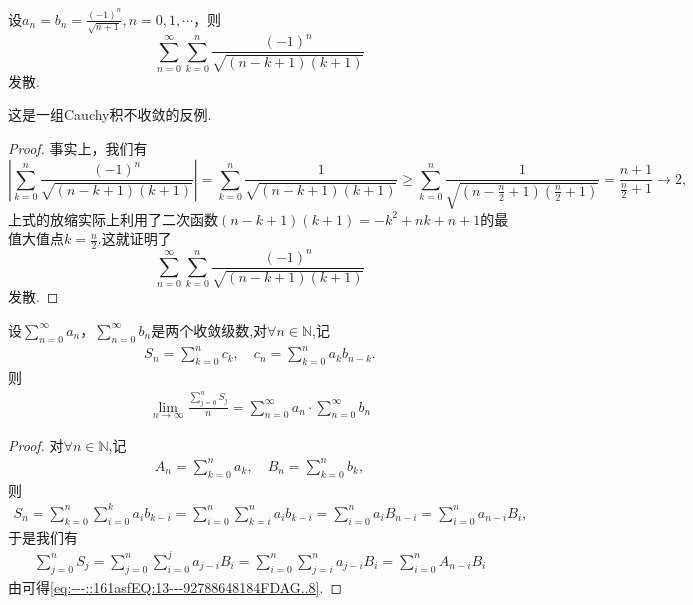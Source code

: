 \documentclass[../../main.tex]{subfiles}%
\begin{document}
\begin{example}
设\(a_n = b_n = \frac{(-1)^n}{\sqrt{n + 1}}, n = 0,1,\cdots\)，则
\[
\sum_{n = 0}^{\infty} \sum_{k = 0}^{n} \frac{(-1)^n}{\sqrt{(n - k + 1)(k + 1)}}
\]
发散.
\end{example}
\begin{remark}
这是一组Cauchy积不收敛的反例.
\end{remark}
\begin{proof}
事实上，我们有
\[
\left| \sum_{k = 0}^{n} \frac{(-1)^n}{\sqrt{(n - k + 1)(k + 1)}} \right| = \sum_{k = 0}^{n} \frac{1}{\sqrt{(n - k + 1)(k + 1)}} \geqslant \sum_{k = 0}^{n} \frac{1}{\sqrt{\left(n - \frac{n}{2} + 1\right)\left(\frac{n}{2} + 1\right)}} = \frac{n + 1}{\frac{n}{2} + 1} \to 2,
\]
上式的放缩实际上利用了二次函数$\left( n-k+1 \right) \left( k+1 \right) =-k^2+nk+n+1$的最值大值点$k=\frac{n}{2}$.这就证明了
\[
\sum_{n = 0}^{\infty} \sum_{k = 0}^{n} \frac{(-1)^n}{\sqrt{(n - k + 1)(k + 1)}}
\]
发散.
\end{proof}

\begin{proposition}\label{proposition:命题3....4}
设\(\sum_{n = 0}^{\infty} a_n\)，\(\sum_{n = 0}^{\infty} b_n\)是两个收敛级数,对$\forall n\in \mathbb{N}$,记
\begin{align*}
S_n = \sum_{k = 0}^{n} c_k,\quad c_n = \sum_{k = 0}^{n} a_k b_{n - k}.
\end{align*}
则
\begin{align}
\lim\limits_{n\to\infty} \frac{\sum\limits_{j=0}^{n} S_j}{n} = \sum\limits_{n=0}^{\infty} a_n \cdot \sum\limits_{n=0}^{\infty} b_n
\label{eq:---::161asfEQ:13---92788648184FDAG..8}
\end{align}
\end{proposition}
\begin{proof}
对$\forall n\in \mathbb{N}$,记
\begin{align*}
A_n = \sum_{k = 0}^{n} a_k,\quad B_n = \sum_{k = 0}^{n} b_k,
\end{align*}
则
\begin{align*}
S_n = \sum\limits_{k=0}^{n} \sum\limits_{i=0}^{k} a_i b_{k-i} = \sum\limits_{i=0}^{n} \sum\limits_{k=i}^{n} a_i b_{k-i} = \sum\limits_{i=0}^{n} a_i B_{n-i} = \sum\limits_{i=0}^{n} a_{n-i} B_i,
\end{align*}
于是我们有
\begin{align*}
\sum\limits_{j=0}^{n} S_j = \sum\limits_{j=0}^{n} \sum\limits_{i=0}^{j} a_{j-i} B_i = \sum\limits_{i=0}^{n} \sum\limits_{j=i}^{n} a_{j-i} B_i = \sum\limits_{i=0}^{n} A_{n-i} B_i
\end{align*}
由可得\eqref{eq:---::161asfEQ:13---92788648184FDAG..8}.
\end{proof}
\end{document}

